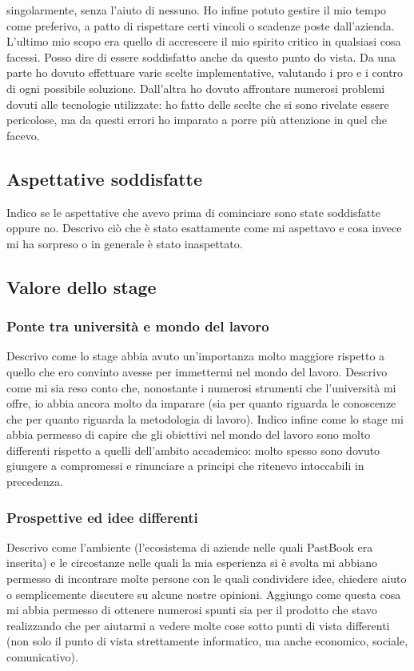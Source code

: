 			singolarmente, senza l'aiuto di nessuno. Ho infine potuto gestire il mio tempo come preferivo, a patto di rispettare certi
			vincoli o scadenze poste dall'azienda.\\
			L'ultimo mio scopo era quello di accrescere il mio spirito critico in qualsiasi cosa facessi. Posso dire di essere
			soddisfatto anche da questo punto do vista. Da una parte ho dovuto effettuare varie scelte implementative, valutando i pro e
			i contro di ogni possibile soluzione. Dall'altra ho dovuto affrontare numerosi problemi dovuti alle tecnologie utilizzate:
			ho fatto delle scelte che si sono rivelate essere pericolose, ma da questi errori ho imparato a porre più attenzione in quel
			che facevo.
		\subsection{Aspettative soddisfatte}
			Indico se le aspettative che avevo prima di cominciare sono state soddisfatte oppure no. Descrivo ciò che è stato esattamente
			come mi aspettavo e cosa invece mi ha sorpreso o in generale è stato inaspettato.
		\subsection{Valore dello stage}
			\subsubsection{Ponte tra università e mondo del lavoro}
				Descrivo come lo stage abbia avuto un'importanza molto maggiore rispetto a quello che ero convinto avesse per
				immettermi nel mondo del lavoro. Descrivo come mi sia reso conto che, nonostante i numerosi strumenti che
				l'università mi offre, io abbia ancora molto da imparare (sia per quanto riguarda le conoscenze che per quanto
				riguarda la metodologia di lavoro). Indico infine come lo stage mi abbia permesso di capire che gli obiettivi nel
				mondo del lavoro sono molto differenti rispetto a quelli dell'ambito accademico: molto spesso sono dovuto giungere
				a compromessi e rinunciare a principi che ritenevo intoccabili in precedenza.
			\subsubsection{Prospettive ed idee differenti}
				Descrivo come l'ambiente (l'ecosistema di aziende nelle quali PastBook era inserita) e le circostanze nelle quali la
				mia esperienza si è svolta mi abbiano permesso di incontrare molte persone con le quali condividere idee, chiedere
				aiuto o semplicemente discutere su alcune nostre opinioni. Aggiungo come questa cosa mi abbia permesso di ottenere
				numerosi spunti sia per il prodotto che stavo realizzando che per aiutarmi a vedere molte cose sotto punti di vista
				differenti (non solo il punto di vista strettamente informatico, ma anche economico, sociale, comunicativo).

